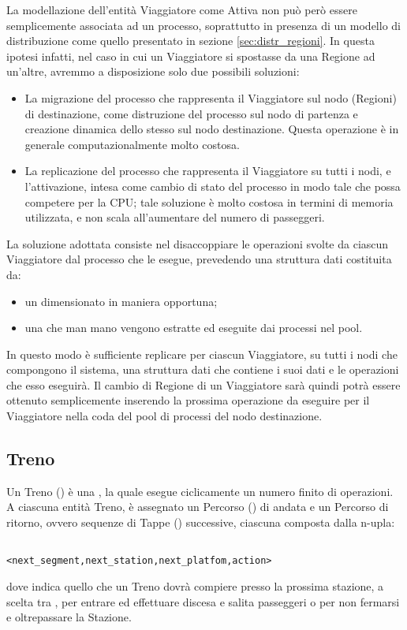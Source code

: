 	La modellazione dell'entità Viaggiatore come Attiva non può però essere semplicemente associata ad un processo, soprattutto in presenza di un modello di distribuzione come quello presentato in sezione \ref{sec:distr_regioni}.
	In questa ipotesi infatti, nel caso in cui un Viaggiatore si spostasse da una Regione ad un'altre, avremmo a disposizione solo due possibili soluzioni:
		\begin{itemize}
			\item La migrazione del processo che rappresenta il Viaggiatore sul nodo (Regioni) di destinazione, come distruzione del processo sul nodo di partenza e creazione dinamica dello stesso sul nodo destinazione. Questa operazione è in generale computazionalmente molto costosa. 
			\item La replicazione del processo che rappresenta il Viaggiatore su tutti i nodi, e l'attivazione, intesa come cambio di stato del processo in modo tale che possa competere per la CPU; tale soluzione è molto costosa in termini di memoria utilizzata, e non scala all'aumentare del numero di passeggeri.
		\end{itemize}
	La soluzione adottata consiste nel disaccoppiare le operazioni svolte da ciascun Viaggiatore dal processo che le esegue, prevedendo una struttura dati costituita da:
		\begin{itemize}
			\item un  dimensionato in maniera opportuna;
			\item una  che man mano vengono estratte ed eseguite dai processi nel pool.
		\end{itemize}
	In questo modo è sufficiente replicare per ciascun Viaggiatore, su tutti i nodi che compongono il sistema, una struttura dati che contiene i suoi dati e le operazioni che esso eseguirà. 
	Il cambio di Regione di un Viaggiatore sarà quindi potrà essere ottenuto semplicemente inserendo la prossima operazione da eseguire per il Viaggiatore nella coda del pool di processi del nodo destinazione.  
		
	\subsection{Treno}
			Un Treno () è una , la quale esegue ciclicamente un numero finito di operazioni. A ciascuna entità Treno, è assegnato un Percorso () di andata e un Percorso di ritorno, ovvero sequenze di Tappe () successive, ciascuna composta dalla n-upla:
				\begin{center}
					\begin{verbatim}
						       <next_segment,next_station,next_platfom,action>
					\end{verbatim}
				\end{center}
dove  indica quello che un Treno dovrà compiere presso la prossima stazione, a scelta tra , per entrare ed effettuare discesa e salita passeggeri o  per non fermarsi e oltrepassare la Stazione.

